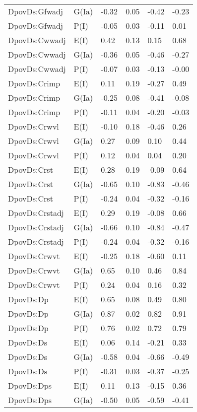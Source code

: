 \begin{center}
\begin{longtable}{|p{1.1in}|p{0.7in}|p{0.7in}|p{0.6in}|p{0.6in}|p{0.6in}|}
  DpovDs:Gfwadj & G(Ia) & -0.32 & 0.05 & -0.42 & -0.23 \\ 
  DpovDs:Gfwadj & P(I) & -0.05 & 0.03 & -0.11 & 0.01 \\ 
  DpovDs:Cwwadj & E(I) & 0.42 & 0.13 & 0.15 & 0.68 \\ 
  DpovDs:Cwwadj & G(Ia) & -0.36 & 0.05 & -0.46 & -0.27 \\ 
  DpovDs:Cwwadj & P(I) & -0.07 & 0.03 & -0.13 & -0.00 \\ 
  DpovDs:Crimp & E(I) & 0.11 & 0.19 & -0.27 & 0.49 \\ 
  DpovDs:Crimp & G(Ia) & -0.25 & 0.08 & -0.41 & -0.08 \\ 
  DpovDs:Crimp & P(I) & -0.11 & 0.04 & -0.20 & -0.03 \\ 
  DpovDs:Crwvl & E(I) & -0.10 & 0.18 & -0.46 & 0.26 \\ 
  DpovDs:Crwvl & G(Ia) & 0.27 & 0.09 & 0.10 & 0.44 \\ 
  DpovDs:Crwvl & P(I) & 0.12 & 0.04 & 0.04 & 0.20 \\ 
  DpovDs:Crst & E(I) & 0.28 & 0.19 & -0.09 & 0.64 \\ 
  DpovDs:Crst & G(Ia) & -0.65 & 0.10 & -0.83 & -0.46 \\ 
  DpovDs:Crst & P(I) & -0.24 & 0.04 & -0.32 & -0.16 \\ 
  DpovDs:Crstadj & E(I) & 0.29 & 0.19 & -0.08 & 0.66 \\ 
  DpovDs:Crstadj & G(Ia) & -0.66 & 0.10 & -0.84 & -0.47 \\ 
  DpovDs:Crstadj & P(I) & -0.24 & 0.04 & -0.32 & -0.16 \\ 
  DpovDs:Crwvt & E(I) & -0.25 & 0.18 & -0.60 & 0.11 \\ 
  DpovDs:Crwvt & G(Ia) & 0.65 & 0.10 & 0.46 & 0.84 \\ 
  DpovDs:Crwvt & P(I) & 0.24 & 0.04 & 0.16 & 0.32 \\ 
  DpovDs:Dp & E(I) & 0.65 & 0.08 & 0.49 & 0.80 \\ 
  DpovDs:Dp & G(Ia) & 0.87 & 0.02 & 0.82 & 0.91 \\ 
  DpovDs:Dp & P(I) & 0.76 & 0.02 & 0.72 & 0.79 \\ 
  DpovDs:Ds & E(I) & 0.06 & 0.14 & -0.21 & 0.33 \\ 
  DpovDs:Ds & G(Ia) & -0.58 & 0.04 & -0.66 & -0.49 \\ 
  DpovDs:Ds & P(I) & -0.31 & 0.03 & -0.37 & -0.25 \\ 
  DpovDs:Dps & E(I) & 0.11 & 0.13 & -0.15 & 0.36 \\ 
  DpovDs:Dps & G(Ia) & -0.50 & 0.05 & -0.59 & -0.41 \\ 

\end{longtable}
\end{center}

